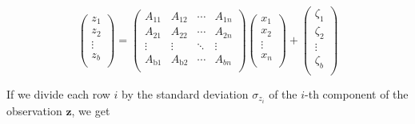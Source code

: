 \documentclass[10pt,oneside,x11names]{article}
\begin{document}
\begin{equation*}
\left(
\begin{array}{c}
 z_1 \\
 z_2 \\
 \vdots  \\
 z_b \\
\end{array}
\right)=\left(
\begin{array}{cccc}
 A_{11} & A_{12} & \cdots  & A_{1 n} \\
 A_{21} & A_{22} & \cdots  & A_{2 n} \\
 \vdots  & \vdots  & \ddots & \vdots  \\
 A_{\text{b1}} & A_{\text{b2}} & \cdots  & A_{b n} \\
\end{array}
\right) \left(
\begin{array}{c}
 x_1 \\
 x_2 \\
 \vdots  \\
 x_n \\
\end{array}
\right)+\left(
\begin{array}{c}
 \zeta _1 \\
 \zeta _2 \\
 \vdots  \\
 \zeta _b \\
\end{array}
\right)
\end{equation*}

If we divide each row \(i\) by the standard deviation \(\sigma_{z_i}\) of the \mbox{$i$-th}
component of the observation \(\mathbold{z}\), we get
\end{document}
